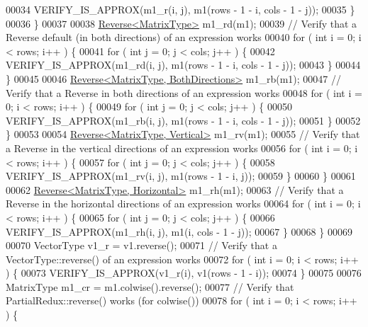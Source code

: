 \begin{DoxyCode}
00034       VERIFY\_IS\_APPROX(m1\_r(i, j), m1(rows - 1 - i, cols - 1 - j));
00035     \}
00036   \}
00037 
00038   \hyperlink{group___core___module_class_eigen_1_1_reverse}{Reverse<MatrixType>} m1\_rd(m1);
00039   \textcolor{comment}{// Verify that a Reverse default (in both directions) of an expression works}
00040   \textcolor{keywordflow}{for} ( \textcolor{keywordtype}{int} i = 0; i < rows; i++ ) \{
00041     \textcolor{keywordflow}{for} ( \textcolor{keywordtype}{int} j = 0; j < cols; j++ ) \{
00042       VERIFY\_IS\_APPROX(m1\_rd(i, j), m1(rows - 1 - i, cols - 1 - j));
00043     \}
00044   \}
00045 
00046   \hyperlink{group___core___module_class_eigen_1_1_reverse}{Reverse<MatrixType, BothDirections>} m1\_rb(m1);
00047   \textcolor{comment}{// Verify that a Reverse in both directions of an expression works}
00048   \textcolor{keywordflow}{for} ( \textcolor{keywordtype}{int} i = 0; i < rows; i++ ) \{
00049     \textcolor{keywordflow}{for} ( \textcolor{keywordtype}{int} j = 0; j < cols; j++ ) \{
00050       VERIFY\_IS\_APPROX(m1\_rb(i, j), m1(rows - 1 - i, cols - 1 - j));
00051     \}
00052   \}
00053 
00054   \hyperlink{group___core___module_class_eigen_1_1_reverse}{Reverse<MatrixType, Vertical>} m1\_rv(m1);
00055   \textcolor{comment}{// Verify that a Reverse in the vertical directions of an expression works}
00056   \textcolor{keywordflow}{for} ( \textcolor{keywordtype}{int} i = 0; i < rows; i++ ) \{
00057     \textcolor{keywordflow}{for} ( \textcolor{keywordtype}{int} j = 0; j < cols; j++ ) \{
00058       VERIFY\_IS\_APPROX(m1\_rv(i, j), m1(rows - 1 - i, j));
00059     \}
00060   \}
00061 
00062   \hyperlink{group___core___module_class_eigen_1_1_reverse}{Reverse<MatrixType, Horizontal>} m1\_rh(m1);
00063   \textcolor{comment}{// Verify that a Reverse in the horizontal directions of an expression works}
00064   \textcolor{keywordflow}{for} ( \textcolor{keywordtype}{int} i = 0; i < rows; i++ ) \{
00065     \textcolor{keywordflow}{for} ( \textcolor{keywordtype}{int} j = 0; j < cols; j++ ) \{
00066       VERIFY\_IS\_APPROX(m1\_rh(i, j), m1(i, cols - 1 - j));
00067     \}
00068   \}
00069 
00070   VectorType v1\_r = v1.reverse();
00071   \textcolor{comment}{// Verify that a VectorType::reverse() of an expression works}
00072   \textcolor{keywordflow}{for} ( \textcolor{keywordtype}{int} i = 0; i < rows; i++ ) \{
00073     VERIFY\_IS\_APPROX(v1\_r(i), v1(rows - 1 - i));
00074   \}
00075 
00076   MatrixType m1\_cr = m1.colwise().reverse();
00077   \textcolor{comment}{// Verify that PartialRedux::reverse() works (for colwise())}
00078   \textcolor{keywordflow}{for} ( \textcolor{keywordtype}{int} i = 0; i < rows; i++ ) \{

\end{DoxyCode}
